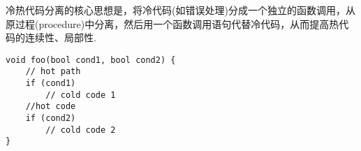 冷热代码分离的核心思想是，将冷代码(如错误处理)分成一个独立的函数调用，从原过程(procedure)中分离，然后用一个函数调用语句代替冷代码，从而提高热代码的连续性、局部性.
\begin{lstlisting}
void foo(bool cond1, bool cond2) {
    // hot path
    if (cond1)
        // cold code 1
    //hot code
    if (cond2)
        // cold code 2
}
\end{lstlisting}